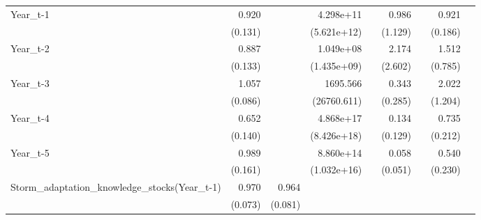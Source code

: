 \begin{table}[htbp]
\begin{tabular}{l*{8}{D{.}{.}{-1}}}
Year\_t-1    &       0.920         &                     &   4.298e+11\sym{**} &                     &       0.986         &                     &       0.921         &                     \\
            &     (0.131)         &                     & (5.621e+12)         &                     &     (1.129)         &                     &     (0.186)         &                     \\
Year\_t-2    &       0.887         &                     &   1.049e+08         &                     &       2.174         &                     &       1.512         &                     \\
            &     (0.133)         &                     & (1.435e+09)         &                     &     (2.602)         &                     &     (0.785)         &                     \\
Year\_t-3    &       1.057         &                     &    1695.566         &                     &       0.343         &                     &       2.022         &                     \\
            &     (0.086)         &                     & (26760.611)         &                     &     (0.285)         &                     &     (1.204)         &                     \\
Year\_t-4    &       0.652\sym{**} &                     &   4.868e+17\sym{**} &                     &       0.134\sym{**} &                     &       0.735         &                     \\
            &     (0.140)         &                     & (8.426e+18)         &                     &     (0.129)         &                     &     (0.212)         &                     \\
Year\_t-5    &       0.989         &                     &   8.860e+14\sym{***}&                     &       0.058\sym{***}&                     &       0.540         &                     \\
            &     (0.161)         &                     & (1.032e+16)         &                     &     (0.051)         &                     &     (0.230)         &                     \\
Storm\_adaptation\_knowledge\_stocks(Year\_t-1)&       0.970         &       0.964         &                     &                     &                     &                     &                     &                     \\
            &     (0.073)         &     (0.081)         &                     &                     &                     &                     &                     &                     \\

\end{tabular}
\end{table}
